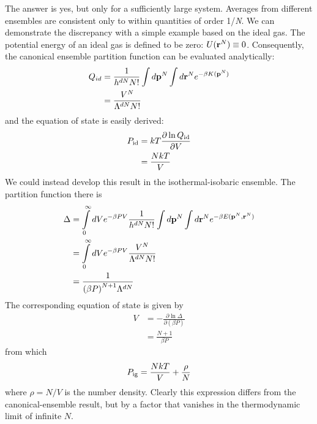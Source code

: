 \documentclass[9pt,bestpractices]{molsim}
\begin{document}
The answer is yes, but only for a sufficiently large system. Averages
from different ensembles are consistent only to within quantities of
order 1/\emph{N}. We can demonstrate the discrepancy with a simple
example based on the ideal gas. The potential energy of an ideal gas is
defined to be zero: $U({{\bf{r}}^N}) \equiv 0$. Consequently, the canonical ensemble partition
function can be evaluated analytically:
\begin{align*}
{Q_{id}} &= \frac{1}{{{h^{dN}}N!}}\int {d{{\bf{p}}^N}\int {d{{\bf{r}}^N}} {e^{ - \beta K({{\bf{p}}^N})}}} \\
 &= \frac{{{V^N}}}{{{\Lambda ^{dN}}N!}}
\end{align*}
and the equation of state is easily derived:
\begin{align*}
{P_{\rm id}} &= kT\frac{{\partial \ln {Q_{\rm {id}}}}}{{\partial V}}\\
 &= \frac{{NkT}}{V}
\end{align*}
We could instead develop this result in the isothermal-isobaric
ensemble. The partition function there is
\begin{align*}
\Delta  &= \int\limits_0^\infty  {dV{e^{ - \beta PV}}\frac{1}{{{h^{dN}}N!}}\int {d{{\bf{p}}^N}\int {d{{\bf{r}}^N}} {e^{ - \beta E({{\bf{p}}^N},{{\bf{r}}^N})}}} } \\
 &= \int\limits_0^\infty  {dV{e^{ - \beta PV}}\frac{{{V^N}}}{{{\Lambda ^{dN}}N!}}} \\
 &= \frac{1}{{{{(\beta P)}^{N + 1}}{\Lambda ^{dN}}}}
\end{align*}
The corresponding equation of state is given by
\begin{align*}
V &=  - \frac{{\partial \ln \Delta }}{{\partial (\beta P)}}\\
 &= \frac{{N + 1}}{{\beta P}}
\end{align*}
from which
\[{P_{\rm ig}} = \frac{{NkT}}{V} + \frac{\rho }{N}\]
where $\rho = N/V$ is the number density. Clearly this expression differs
from the canonical-ensemble result, but by a factor that vanishes in the
thermodynamic limit of infinite $N$.


\end{document}
